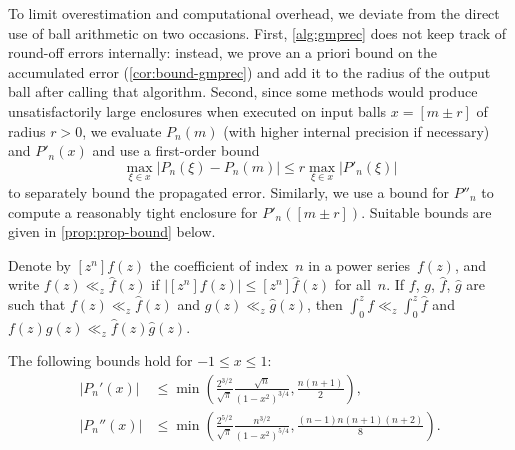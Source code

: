 \documentclass[nohypdvips,review]{siamart0216}
\begin{document}
To limit overestimation and computational overhead, we deviate from the
direct use of ball arithmetic on two occasions.
First, \cref{alg:gmprec} does not keep track of round-off
errors internally: instead, we prove an a priori bound on the
accumulated error (\cref{cor:bound-gmprec}) and add it to the
radius of the output ball after calling that algorithm.
Second, since some methods would produce unsatisfactorily large
enclosures when executed on input balls $x = [m \pm r]$ of radius
$r > 0$, we evaluate $P_n(m)$ (with higher internal precision if
necessary) and $P'_n(x)$ and use a first-order bound
\[ \max_{\xi \in x} |P_n(\xi) - P_n(m)|
   \le r \max_{\xi \in x} |P'_n(\xi)| \]
to separately bound the propagated error.
Similarly, we use a bound for $P''_n$ to compute a reasonably
tight enclosure for $P'_n([m \pm r])$.
Suitable bounds are given in \cref{prop:prop-bound} below.

\begin{lemma} \label{lemma:majorants}
Denote by $[z^n] f(z)$ the coefficient of index $n$ in a power
series $f(z)$, and write $f(z) \ll_z \hat f(z)$ if
$| [z^n] f(z) | \leq [z^n] \hat f(z)$ for all $n$.
If $f$, $g$, $\hat f$, $\hat g$ are such that
$f(z) \ll_z \hat f(z)$ and $g(z) \ll_z \hat g(z)$, then
$\int_0^z f \ll_z \int_0^z \hat f$ and
$f(z)g(z) \ll_z \hat f(z) \hat g(z)$.
\end{lemma}

\begin{proposition} \label{prop:prop-bound}
The following bounds hold for $-1 \leq x \leq 1$:
\begin{align}
\label{eq:prop-bound}
  |P_n'(x)| &\le \min\left(
      \frac{2^{3/2}}{\sqrt{\pi}} \frac{\sqrt n}{(1-x^2)^{3/4}},
      \frac{n(n+1)}{2}
  \right), \\
\label{eq:prop-bound1}
  |P_n''(x)|
  &\le \min\left(
      \frac{2^{5/2}}{\sqrt{\pi}} \frac{n^{3/2}}{(1-x^2)^{5/4}},
      \frac{(n-1) n (n+1) (n+2)}{8}
  \right).
\end{align}
\end{proposition}
\end{document}
